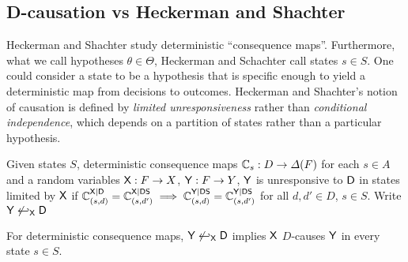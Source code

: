 \subsection{D-causation vs Heckerman and Shachter}

Heckerman and Shachter study deterministic ``consequence maps''. Furthermore, what we call hypotheses $\theta\in\Theta$, Heckerman and Schachter call states $s\in S$. One could consider a state to be a hypothesis that is specific enough to yield a deterministic map from decisions to outcomes. Heckerman and Shachter's notion of causation is defined by \emph{limited unresponsiveness} rather than \emph{conditional independence}, which depends on a partition of states rather than a particular hypothesis.

\begin{definition}
    Given states $S$, deterministic consequence maps $\mathbb{C}_s:D\to \Delta(F)$ for each $s\in A$ and a random variables $\mathsf{X}:F\to X$, $\mathsf{Y}:F\to Y$, $\mathsf{Y}$ is unresponsive to $\mathsf{D}$ in states limited by $\mathsf{X}$ if $\mathbb{C}_{(s,d)}^{\mathsf{X}|\mathsf{D}}=\mathbb{C}_{(s,d')}^{\mathsf{X}|\mathsf{D}\mathsf{S}}\implies \mathbb{C}_{(s,d)}^{\mathsf{Y}|\mathsf{D}\mathsf{S}}=\mathbb{C}_{(s,d')}^{\mathsf{Y}|\mathsf{D}\mathsf{S}}$ for all $d,d'\in D$, $s\in S$. Write $\mathsf{Y}\not\hookleftarrow_{\mathsf{X}} \mathsf{D}$
\end{definition}

\begin{lemma}
For deterministic consequence maps, $\mathsf{Y}\not\hookleftarrow_{\mathsf{X}} \mathsf{D} $ implies $\mathsf{X}$ $D$-causes $\mathsf{Y}$ in every state $s\in S$.
\end{lemma}

